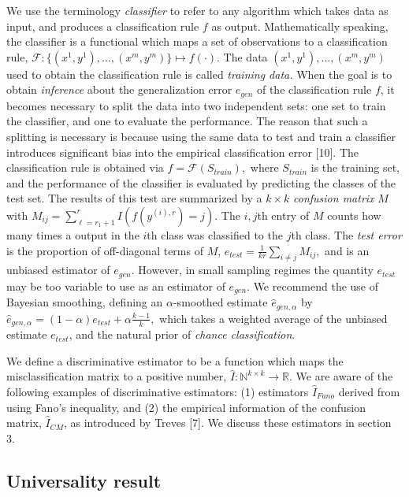 \documentclass{article}
\begin{document}
We use the terminology
\emph{classifier} to refer to any algorithm which takes data as input,
and produces a classification rule $f$ as output.  Mathematically
speaking, the classifier is a functional which maps a set of
observations to a classification rule, $ \mathcal{F}:
\{(x^{1},y^{1}),\hdots, (x^{m}, y^{m})\} \mapsto f(\cdot).  $ The data
$(x^1,y^1),\hdots, (x^m, y^m)$ used to obtain the classification rule
is called \emph{training data.}  When the goal is to obtain
\emph{inference} about the generalization error $e_{gen}$ of the
classification rule $f$, it becomes necessary to split the data into
two independent sets: one set to train the classifier, and one to
evaluate the performance.  The reason that such a splitting is
necessary is because using the same data to test and train a
classifier introduces significant bias into the empirical
classification error [10].  The classification
rule is obtained via $ f = \mathcal{F}(S_{train}), $ where $S_{train}$ is the training set,
 and the performance of the classifier is evaluated by predicting the classes
of the test set.  The results of this test are summarized by a $k
\times k$ \emph{confusion matrix} $M$ with $ M_{ij} = \sum_{\ell=r_1 +
  1}^r I(f(y^{(i), r}) = j).  $ The $i, j$th entry of $M$ counts how
many times a output in the $i$th class was classified to the $j$th
class.  The \emph{test error} is the proportion of off-diagonal terms
of $M$, $ e_{test} = \frac{1}{kr} \sum_{i \neq j} M_{ij}, $ and is an
unbiased estimator of $e_{gen}$.  However, in small sampling regimes
the quantity $e_{test}$ may be too variable to use as an estimator of
$e_{gen}$.  We recommend the use of Bayesian smoothing, defining an
$\alpha$-smoothed estimate $\hat{e}_{gen, \alpha}$ by $ \hat{e}_{gen,
  \alpha} = (1 - \alpha) e_{test} + \alpha \frac{k-1}{k}, $ which
takes a weighted average of the unbiased estimate $e_{test}$, and the
natural prior of \emph{chance classification}.

We define a discriminative estimator to be a function which maps the
misclassification matrix to a positive number, $ \hat{I}:
\mathbb{N}^{k \times k} \to \mathbb{R}.  $ We are aware of the
following examples of discriminative estimators: (1) estimators $\hat{I}_{Fano}$
derived from using Fano's inequality, and (2) the empirical
information of the confusion matrix, $\hat{I}_{CM}$, as introduced by Treves [7].
We discuss these estimators in section 3.


\subsection{Universality result}
\end{document}
